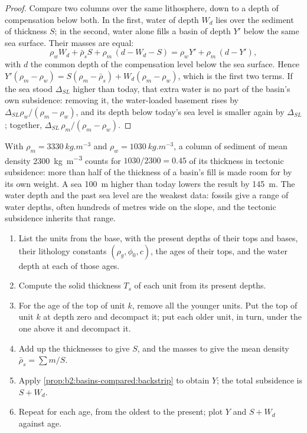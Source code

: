 \begin{proof}
Compare two columns over the same lithosphere, down to a depth of compensation below both. In
the first, water of depth $W_d$ lies over the sediment of thickness $S$; in the second, water
alone fills a basin of depth $Y'$ below the same sea surface. Their masses are equal:
\[
  \rho_w W_d + \bar\rho_s S + \rho_m\,(d - W_d - S) = \rho_w Y' + \rho_m\,(d - Y'),
\]
with $d$ the common depth of the compensation level below the sea surface. Hence
$Y'(\rho_m - \rho_w) = S(\rho_m - \bar\rho_s) + W_d(\rho_m - \rho_w)$, which is the first two
terms. If the sea stood $\Delta_{SL}$ higher than today, that extra water is no part of the
basin's own subsidence: removing it, the water-loaded basement rises by
$\Delta_{SL}\rho_w/(\rho_m - \rho_w)$, and its depth below today's sea level is smaller again by
$\Delta_{SL}$; together, $\Delta_{SL}\,\rho_m/(\rho_m - \rho_w)$.
\end{proof}

With $\rho_m = \qty{3330}{kg.m^{-3}}$ and $\rho_w = \qty{1030}{kg.m^{-3}}$, a column of sediment of
mean density \qty{2300}{kg.m^{-3}} counts for $1030/2300 = 0.45$ of its thickness in tectonic
subsidence: more than half of the thickness of a basin's fill is made room for by its own weight.
A sea \qty{100}{m} higher than today lowers the result by \qty{145}{m}. The water depth and the
past sea level are the weakest data: fossils give a range of water depths, often hundreds of
metres wide on the slope, and the tectonic subsidence inherits that range.

\begin{method}\label{met:b2:basins-compared:backstrip}
\begin{enumerate}
  \item List the units from the base, with the present depths of their tops and bases, their
        lithology constants $(\rho_g, \phi_0, c)$, the ages of their tops, and the water depth at
        each of those ages.
  \item Compute the solid thickness $T_s$ of each unit from its present depths.
  \item For the age of the top of unit $k$, remove all the younger units. Put the top of unit
        $k$ at depth zero and decompact it; put each older unit, in turn, under the one above it
        and decompact it.
  \item Add up the thicknesses to give $S$, and the masses to give the mean density
        $\bar\rho_s = \sum m / S$.
  \item Apply \cref{prop:b2:basins-compared:backstrip} to obtain $Y$; the total subsidence is
        $S + W_d$.
  \item Repeat for each age, from the oldest to the present; plot $Y$ and $S + W_d$ against age.
\end{enumerate}
\end{method}

